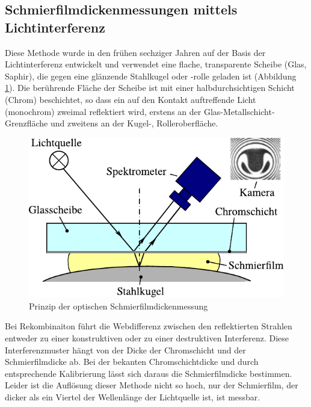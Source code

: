 \subsection{Schmierfilmdickenmessungen mittels Lichtinterferenz}
\label{sub:schmierfilmdickenmessung_mittels_lichtinterferenz}

Diese Methode wurde in den frühen sechziger Jahren auf der Basis der Lichtinterferenz entwickelt und verwendet eine flache, transparente Scheibe (Glas, Saphir), die gegen eine glänzende Stahlkugel oder -rolle geladen ist (Abbildung \ref{fig:ehd_pruefsprinzip_furtuna}).
Die berührende Fläche der Scheibe ist mit einer halbdurchsichtigen Schicht (Chrom) beschichtet, so dass ein auf den Kontakt auftreffende Licht (monochrom) zweimal reflektiert wird, erstens an der Glas-Metallschicht-Grenzfläche und zweitens an der Kugel-, Rolleroberfläche.
\begin{figure}[htb]
    \centering
    \includegraphics[]{./images/ehd_pruefsprinzip_furtuna.pdf}
    \caption{Prinzip der optischen Schmierfilmdickenmessung \cite{furtuna_2011}}
    \label{fig:ehd_pruefsprinzip_furtuna}
\end{figure}
%

Bei Rekombinaiton führt die Webdifferenz zwischen den reflektierten Strahlen entweder zu einer konstruktiven oder zu einer destruktiven Interferenz.
Diese Interferenzmuster hängt von der Dicke der Chromschicht und der Schmierfilmdicke ab.
Bei der bekanten Chromschichtdicke und durch entsprechende Kalibrierung lässt sich daraus die Schmierfilmdicke bestimmen.
Leider ist die Auflösung dieser Methode nicht so hoch, nur der Schmierfilm, der dicker als ein Viertel der Wellenlänge der Lichtquelle ist, ist messbar.


